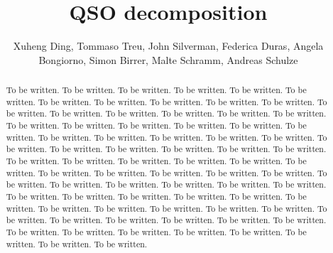 \documentclass[apj]{emulateapj}
\begin{document}
\def\lcdm{$\Lambda$CDM}
\def\hst{{\it HST}}
\def\efr{$R_{\mathrm{eff}}$}
\def\galfit{\sc Galfit}
\def\mbh{$\mathcal M_{\rm BH}$}
\def\lhost{$L_{\rm host}$}
\def\jcap{Journal of Cosmology and Astroparticle Physics}
\def\halpha{${\it H}\alpha$}
\def\hbeta{${\it H}\beta$}
\def\sersic{S\'ersic}
\def\lenstronomy{{\sc Lenstronomy}}
\def\Reff{{$R_{\mathrm{eff}}$}}
\def\kms{km~s$^{\rm -1}$}
\def\sigstar{{$\sigma_*$}}
\def\smass{{$M_*$}}
\newcommand{\Mgii}{Mg$_{\rm II}$}
\newcommand{\Civ}{C$_{\rm IV}$}

\title{QSO decomposition}

\author{Xuheng Ding, Tommaso Treu, John Silverman, Federica Duras, Angela Bongiorno, Simon Birrer, Malte Schramm, Andreas Schulze
 }


\begin{abstract}
To be written. To be written. To be written. To be written. To be written. To be written. To be written. To be written. To be written. To be written. To be written. To be written. To be written. To be written. To be written. To be written. To be written. To be written. To be written. To be written. To be written. To be written. To be written. To be written. To be written. To be written. To be written. To be written. To be written. To be written. To be written. To be written. To be written.  To be written. To be written. To be written. To be written. To be written. To be written. To be written. To be written. To be written. To be written. To be written. To be written. To be written. To be written. To be written. To be written. To be written. To be written. To be written. To be written. To be written. To be written. To be written. To be written. To be written. To be written. To be written. To be written. To be written. To be written. To be written. To be written. To be written. To be written. To be written. To be written. To be written. To be written. To be written. To be written. To be written. To be written. To be written. 
\end{abstract}
\end{document}
